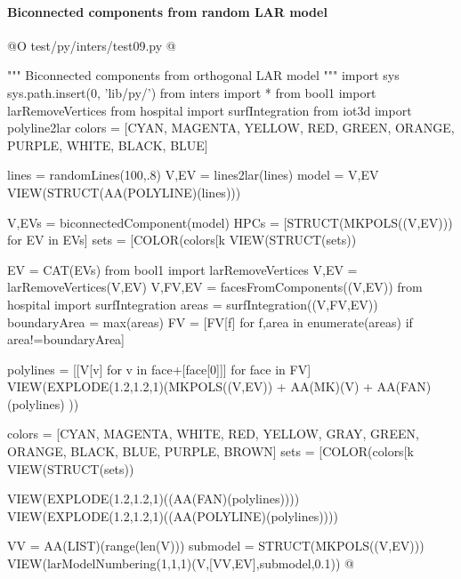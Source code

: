 \documentclass[11pt,oneside]{article}    %
\begin{document}
\paragraph{Biconnected components from random LAR model}
@O test/py/inters/test09.py
@{""" Biconnected components from orthogonal LAR model """
import sys
sys.path.insert(0, 'lib/py/')
from inters import *
from bool1 import larRemoveVertices
from hospital import surfIntegration
from iot3d import polyline2lar
colors = [CYAN, MAGENTA, YELLOW, RED, GREEN, ORANGE, PURPLE, WHITE, BLACK, BLUE]

lines = randomLines(100,.8)
V,EV = lines2lar(lines)
model = V,EV
VIEW(STRUCT(AA(POLYLINE)(lines)))

V,EVs = biconnectedComponent(model)
HPCs = [STRUCT(MKPOLS((V,EV))) for EV in EVs]
sets = [COLOR(colors[k%
VIEW(STRUCT(sets))

EV = CAT(EVs)
from bool1 import larRemoveVertices
V,EV = larRemoveVertices(V,EV)
V,FV,EV = facesFromComponents((V,EV))
from hospital import surfIntegration
areas = surfIntegration((V,FV,EV))
boundaryArea = max(areas)
FV = [FV[f] for f,area in enumerate(areas) if area!=boundaryArea]

polylines = [[V[v] for v in face+[face[0]]] for face in FV]
VIEW(EXPLODE(1.2,1.2,1)(MKPOLS((V,EV)) + AA(MK)(V) + AA(FAN)(polylines) ))

colors = [CYAN, MAGENTA, WHITE, RED, YELLOW, GRAY, GREEN, ORANGE, BLACK, BLUE, PURPLE, BROWN]
sets = [COLOR(colors[k%
VIEW(STRUCT(sets))


VIEW(EXPLODE(1.2,1.2,1)((AA(FAN)(polylines))))
VIEW(EXPLODE(1.2,1.2,1)((AA(POLYLINE)(polylines))))

VV = AA(LIST)(range(len(V)))
submodel = STRUCT(MKPOLS((V,EV)))
VIEW(larModelNumbering(1,1,1)(V,[VV,EV],submodel,0.1))
@}
\end{document}
